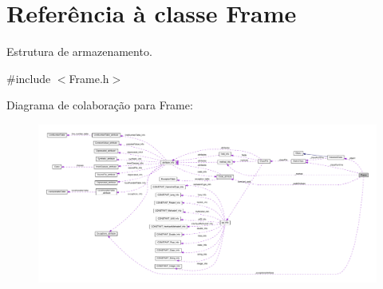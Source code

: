 \hypertarget{classFrame}{}\section{Referência à classe Frame}
\label{classFrame}


Estrutura de armazenamento.  




{\ttfamily \#include $<$Frame.\+h$>$}



Diagrama de colaboração para Frame\+:\nopagebreak
\begin{figure}[H]
\begin{center}
\leavevmode
\includegraphics[width=350pt]{classFrame__coll__graph}
\end{center}
\end{figure}
